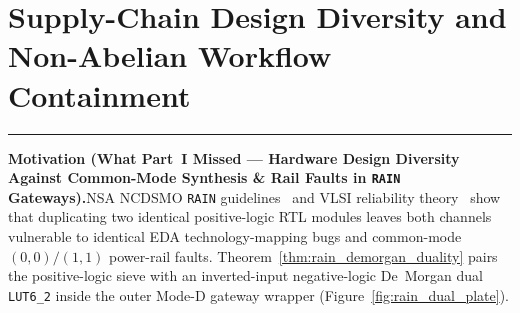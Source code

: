 \documentclass[10pt,twocolumn]{article}
\makeatletter
\newif\ifspecintwocol \specintwocolfalse
\newif\ifspecresume   \specresumefalse
\newcommand{\StopTwoCol}{%
  \if@twocolumn
    \onecolumn
    \global\specintwocolfalse
    \let\spec@next\@empty
  \else
    \ifspecintwocol
      \global\specintwocolfalse
      \def\spec@next{\end{multicols}}%
    \else
      \let\spec@next\@empty
    \fi
  \fi
  \spec@next
}
\newcommand{\BeginConnesPlate}{%
  \if@twocolumn
    \onecolumn
    \global\specresumetrue
    \let\spec@platepre\@empty
  \else
    \ifspecintwocol
      \global\specresumetrue
      \let\spec@platepre\StopTwoCol
    \else
      \global\specresumefalse
      \let\spec@platepre\@empty
    \fi
  \fi
  \spec@platepre
  \par\vspace{4pt}\noindent\textcolor{black!25}{\rule{\textwidth}{0.4pt}}\par\vspace{3pt}%
}
\theoremstyle{spectralthm}
\makeatother
\begin{document}
\section{Supply-Chain Design Diversity and Non-Abelian Workflow Containment}
\label{sec:rain_ifc}

\BeginConnesPlate
\noindent\textbf{Motivation (What Part~I Missed --- Hardware Design Diversity Against Common-Mode Synthesis \& Rail Faults in \texttt{RAIN} Gateways).}\;NSA NCDSMO \texttt{RAIN} guidelines~\cite{ncdsmo2020rain} and VLSI reliability theory~\cite{mitra2000commonmode} show that duplicating two identical positive-logic RTL modules leaves both channels vulnerable to identical EDA technology-mapping bugs and common-mode $(0,0)/(1,1)$ power-rail faults. Theorem~\ref{thm:rain_demorgan_duality} pairs the positive-logic sieve with an inverted-input negative-logic De~Morgan dual \mbox{\texttt{LUT6\_2}} inside the outer Mode-D gateway wrapper (Figure~\ref{fig:rain_dual_plate}).
\end{document}
